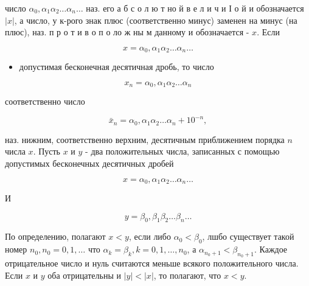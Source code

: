 \documentclass[10pt]{article}
\begin{document}
число $\alpha_{0}, \alpha_{1} \alpha_{2} \ldots \alpha_{n} \ldots$ наз. его а б с о л ю т но й в е л и ч и І о й и обозначается $|x|$, а число, у к-рого знак плюс (соответственно минус) заменен на минус (на плюс), наз. п р о т и в о п о ло ж ны м данному и обозначается - $x$. Если



\[

x=\alpha_{0}, \alpha_{1} \alpha_{2} \ldots \alpha_{n} \ldots

\]



\begin{itemize}

  \item допустимая бесконечная десятичная дробь, то число

\end{itemize}



\[

x_{n}=\alpha_{0}, \alpha_{1} \alpha_{2} \ldots \alpha_{n}

\]



соответственно число



\[

\bar{x}_{n}=\alpha_{0}, \alpha_{1} \alpha_{2} \ldots \alpha_{n}+10^{-n},

\]



наз. нижним, соответственно верхним, десятичным приближением порядка $n$ числа $x$. Пусть $x$ и $y$ - два положительных числа, записанных с помощью допустимых бесконечных десятичных дробей



\[

x=\alpha_{0}, \alpha_{1} \alpha_{2} \ldots \alpha_{n} \ldots

\]



И



\[

y=\beta_{0}, \beta_{1} \beta_{2} \ldots \beta_{n} \ldots

\]



По определению, полагают $x<y$, если либо $\alpha_{0}<\beta_{0}$, лшбо существует такой номер $n_{0}, n_{0}=0,1, \ldots$ что $\alpha_{k}=\beta_{k}, k=0,1, \ldots, n_{0}$, а $\alpha_{n_{0}+1}<\beta_{n_{0}+1}$. Каждое отрицательное число и нуль считаются меньше всякого положительного числа. Если $x$ и $y$ оба отрицательны и $|y|<|x|$, то полагают, что $x<y$.
\end{document}
